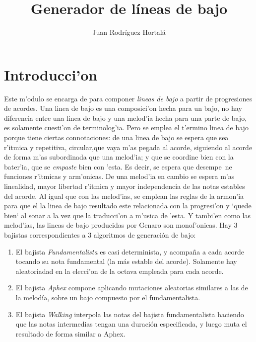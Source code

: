 \documentclass[a4paper,12pt]{article}
\author{Juan Rodr\'iguez Hortal\'a}
\title{Generador de l\'ineas de bajo}
\begin{document}
\maketitle
\tableofcontents
\section{Introducci'on}
Este m'odulo se encarga de para componer \emph{lineas de bajo} a partir de progresiones de acordes. Una linea de bajo es una composici'on hecha para un bajo, no hay diferencia entre una linea de bajo y una melod'ia hecha para una parte de bajo, es solamente cuesti'on de terminolog'ia. Pero se emplea el t'ermino linea de bajo porque tiene ciertas connotaciones: de una linea de bajo se espera que sea r'itmica y repetitiva, circular,que vaya m'as pegada al acorde, siguiendo al acorde de forma m'as subordinada que una melod'ia; y que se coordine bien con la bater'ia, que se \emph{empaste} bien con 'esta. Es decir, se espera que desempe~ne funciones r'itmicas y arm'onicas. De una melod'ia en cambio se espera m'as linealidad, mayor libertad r'itmica y mayor independencia de las notas estables del acorde.\newline
Al igual que con las melod'ias, se emplean las reglas de la armon'ia para que el la linea de bajo resultado este relacionada con la progresi'on y `quede bien` al sonar a la vez que la traducci'on a m'usica de 'esta. Y tambi'en como las melod'ias, las lineas de bajo producidas por Genaro son monof'onicas.\newline
Hay 3 bajistas correspondientes a 3 algoritmos de generación de bajo: 
        \begin{enumerate}
        \item El bajista \emph{Fundamentalista} es casi determinista, y acompaña a cada acorde tocando su nota fundamental (la más estable del acorde). Solamente hay aleatoriadad en la elecci'on de la octava empleada para cada acorde.
        \item El bajista \emph{Aphex} compone aplicando mutaciones aleatorias similares a las de la melodía, sobre un bajo compuesto por el fundamentalista.
        \item El bajista \emph{Walking} interpola las notas del bajista fundamentalista haciendo que las notas intermedias tengan una duración especificada, y luego muta el resultado de forma similar a Aphex.
        \end{enumerate}
\end{document}
